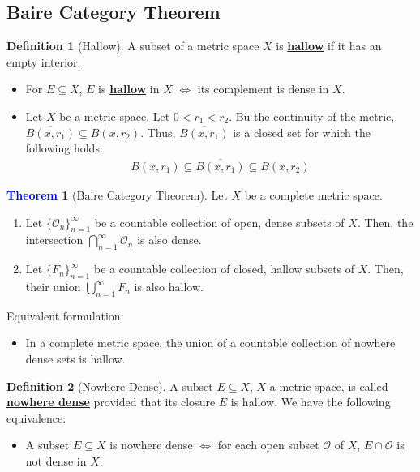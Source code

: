 \documentclass[11pt]{article}
\newcommand{\open}[0]{\mathcal{O}}
\theoremstyle{definition}
\theoremstyle{definition}
\newcommand{\dfn}[1]{\underline{\textbf{#1}}}
\newtheorem{theorem}{\textcolor{blue}{Theorem}}
\theoremstyle{definition}
\newtheorem{definition}{\textcolor{OliveGreen}{Definition}}
\theoremstyle{remark}
\begin{document}
\subsection{Baire Category Theorem}

\begin{definition}[Hallow]
	A subset of a metric space $X$ is \dfn{hallow} if it has an empty interior. 
	\begin{itemize}[noitemsep]
		\item For $E \subseteq X$, $E$ is \dfn{hallow}  in $X$ $\iff$ its complement is dense in $X$. 
		\item Let $X$ be a metric space. Let $0 < r_1 < r_2$. Bu the continuity of the metric, $\overline{B(x, r_1)} \subseteq B(x, r_2) $. Thus, $\overline{B(x, r_1)}$ is a closed set for which the following holds: 
		\begin{align}
			B(x, r_1) \subseteq \overline{B(x, r_1) } \subseteq B(x, r_2) 	
		\end{align}

	\end{itemize}
\end{definition}

\begin{theorem}[Baire Category Theorem]
	Let $X$ be a complete metric space. 
	\begin{enumerate}[noitemsep]
		\item Let $\{ \open_n \}_{n=1}^\infty$ be a countable collection of open, dense subsets of $X$. Then, the intersection $\bigcap_{n=1}^\infty \open_n$ is also dense. 
		\item Let $\{ F_n \}_{n=1}^\infty$ be a countable collection of closed, hallow subsets of $X$. Then, their union $\bigcup_{n=1}^\infty F_n$ is also hallow. 
	\end{enumerate}
	Equivalent formulation:
	\begin{itemize}[noitemsep]
		\item In a complete metric space, the union of a countable collection of nowhere dense sets is hallow. 
	\end{itemize}
\end{theorem}

\begin{definition}[Nowhere Dense]
	A subset $E \subseteq X$, $X$ a metric space, is called \dfn{nowhere dense} provided that its closure $\overline{E}$ is hallow. We have the following equivalence: 
	\begin{itemize}[noitemsep]
		\item A subset $E \subseteq X$ is nowhere dense $\iff$ for each open subset $\open $ of $X$, $E \cap \open$ is not dense in $X$. 
	\end{itemize}
\end{definition}
\end{document}
